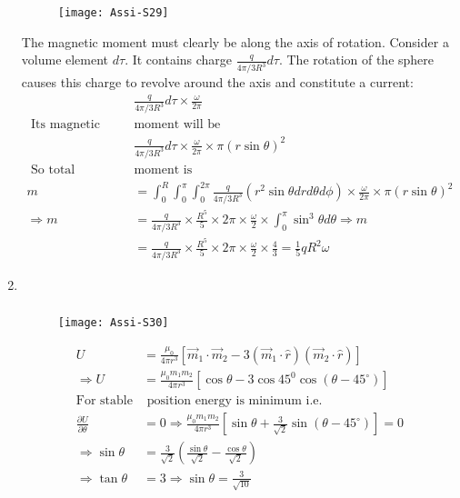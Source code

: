 \begin{enumerate}
	\begin{answer}	$\left. \right. $
		\begin{figure}[H]
			\centering
			\texttt{[image: Assi-S29]}
		\end{figure}
		 The magnetic moment must clearly be along the axis of rotation. Consider a volume element $d \tau$. It contains charge $\frac{q}{4 \pi / 3 R^{3}} d \tau$. The rotation of the sphere causes this charge to revolve around the axis and constitute a current:
		\begin{align*}
		&\frac{q}{4 \pi / 3 R^{3}} d \tau \times \frac{\omega}{2 \pi}\\
	\text{	Its magnetic }&\text{moment will be}\\
		&\frac{q}{4 \pi / 3 R^{3}} d \tau \times \frac{\omega}{2 \pi} \times \pi(r \sin \theta)^{2}\\
	\text{	So total magnetic }&\text{moment is}\\
		m&=\int_{0}^{R} \int_{0}^{\pi} \int_{0}^{2 \pi} \frac{q}{4 \pi / 3 R^{3}}\left(r^{2} \sin \theta d r d \theta d \phi\right) \times \frac{\omega}{2 \pi} \times \pi(r \sin \theta)^{2}\\
		\Rightarrow m&=\frac{q}{4 \pi / 3 R^{3}} \times \frac{R^{5}}{5} \times 2 \pi \times \frac{\omega}{2} \times \int_{0}^{\pi} \sin ^{3} \theta d \theta \Rightarrow m\\&=\frac{q}{4 \pi / 3 R^{3}} \times \frac{R^{5}}{5} \times 2 \pi \times \frac{\omega}{2} \times \frac{4}{3}=\frac{1}{5} q R^{2} \omega
		\end{align*}
	\end{answer}
	\item $\left. \right. $
	\begin{answer}$\left. \right. $
		\begin{figure}[H]
			\centering
			\texttt{[image: Assi-S30]}
		\end{figure}
		\begin{align*}
		U&=\frac{\mu_{0}}{4 \pi r^{3}}\left[\vec{m}_{1} \cdot \vec{m}_{2}-3\left(\vec{m}_{1} \cdot \hat{r}\right)\left(\vec{m}_{2} \cdot \hat{r}\right)\right]\\
		\Rightarrow U&=\frac{\mu_{0} m_{1} m_{2}}{4 \pi r^{3}}\left[\cos \theta-3 \cos 45^{0} \cos \left(\theta-45^{\circ}\right)\right]\\
		\text{For stable}&\text{ position energy is minimum i.e.}\\
		\frac{\partial U}{\partial \theta}&=0 \Rightarrow \frac{\mu_{0} m_{1} m_{2}}{4 \pi r^{3}}\left[\sin \theta+\frac{3}{\sqrt{2}} \sin \left(\theta-45^{\circ}\right)\right]=0 \\
		\Rightarrow \sin \theta&=\frac{3}{\sqrt{2}}\left(\frac{\sin \theta}{\sqrt{2}}-\frac{\cos \theta}{\sqrt{2}}\right) \\
		\Rightarrow \tan \theta&=3 \Rightarrow \sin \theta=\frac{3}{\sqrt{10}}
		\end{align*}
	\end{answer}
	

\end{enumerate}
